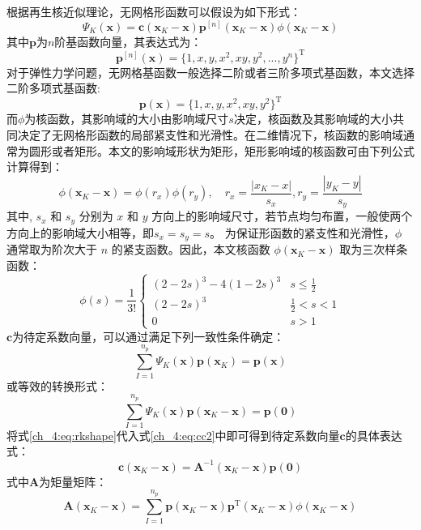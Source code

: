 根据再生核近似理论\cite{liu1995}，无网格形函数可以假设为如下形式：
\begin{equation}\label{ch_4:eq:rkshape}
    \Psi_K(\boldsymbol x) = \boldsymbol c(\boldsymbol x_K-\boldsymbol x) \boldsymbol p^{[n]}(\boldsymbol x_K-\boldsymbol x) \phi(\boldsymbol x_K - \boldsymbol x)
\end{equation}
其中$\boldsymbol p$为$n$阶基函数向量，其表达式为：
\begin{equation}
    \boldsymbol p^{[n]}(\boldsymbol x) = \{ 1, x, y, x^2, xy, y^2,...,y^n\}^\mathrm{T}
\end{equation}
对于弹性力学问题，无网格基函数一般选择二阶或者三阶多项式基函数，本文选择二阶多项式基函数:
\begin{equation}
    \boldsymbol p(\boldsymbol x) = \{ 1, x, y, x^2, xy, y^2\}^\mathrm{T}
\end{equation}
而$\phi$为核函数，其影响域的大小由影响域尺寸$s$决定，核函数及其影响域的大小共同决定了无网格形函数的局部紧支性和光滑性。在二维情况下，核函数的影响域通常为圆形或者矩形。本文的影响域形状为矩形，矩形影响域的核函数可由下列公式计算得到：
\begin{equation}
    \phi(\boldsymbol x_K-\boldsymbol x) = \phi(r_x) \phi(r_y), \quad r_x = \frac{|x_K - x|}{s_{x}},r_y = \frac{| y_K -  y|}{s_{y}}
\end{equation}
其中, $s_x$ 和 $s_y$ 分别为 $x$ 和 $y$ 方向上的影响域尺寸，若节点均匀布置，一般使两个方向上的影响域大小相等，即$s_x = s_y = s$。
为保证形函数的紧支性和光滑性，$\phi$ 通常取为阶次大于 $n$ 的紧支函数。因此，本文核函数 $\phi(\boldsymbol x_K-\boldsymbol x)$ 取为三次样条函数：
\begin{equation}
    \phi(s) =\frac{1}{3!} \begin{cases}
        (2-2s)^3 - 4(1-2s)^3 & s\le\frac{1}{2} \\
        (2-2s)^3 &\frac{1}{2}<s<1 \\
        0 & s> 1
    \end{cases}
\end{equation}
$\boldsymbol c$为待定系数向量，可以通过满足下列一致性条件确定：
\begin{equation}\label{ch_4:eq:cc1}
    \sum_{I=1}^{n_p}\Psi_K(\boldsymbol x) \boldsymbol p(\boldsymbol x_K) = \boldsymbol p (\boldsymbol x)
\end{equation}
或等效的转换形式：
\begin{equation}\label{ch_4:eq:cc2}
    \sum_{I=1}^{n_p}\Psi_K(\boldsymbol x) \boldsymbol p(\boldsymbol x_K-\boldsymbol x) = \boldsymbol p(\boldsymbol 0)
\end{equation}
将式\eqref{ch_4:eq:rkshape}代入式\eqref{ch_4:eq:cc2}中即可得到待定系数向量$\boldsymbol c$的具体表达式：
\begin{equation}\label{ch_4:eq:correction}
    \boldsymbol c(\boldsymbol x_K-\boldsymbol x) = \boldsymbol A^{-1}(\boldsymbol x_K-\boldsymbol x)\boldsymbol p(\boldsymbol 0)
\end{equation}
式中$\boldsymbol A$为矩量矩阵：
\begin{equation}
    \boldsymbol A(\boldsymbol x_K-\boldsymbol x) = \sum_{I=1}^{n_p}\boldsymbol p(\boldsymbol x_K-\boldsymbol x) \boldsymbol p^{\mathrm{T}}(\boldsymbol x_K-\boldsymbol x)\phi(\boldsymbol x_K-\boldsymbol x)
\end{equation}

